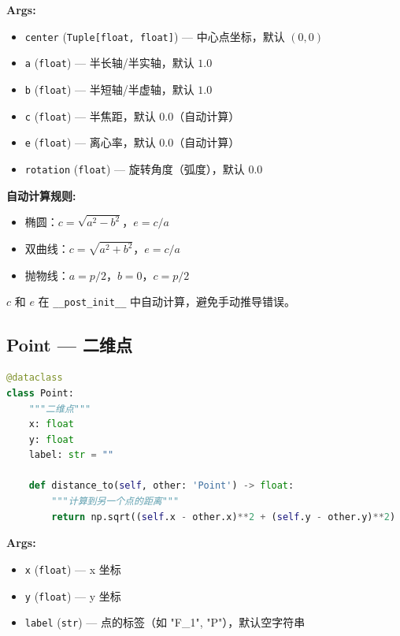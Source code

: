 \documentclass[11pt,a4paper]{article}
\begin{document}
\textbf{Args:}
\begin{itemize}
    \item \texttt{center} (\texttt{Tuple[float, float]}) — 中心点坐标，默认 $(0, 0)$
    \item \texttt{a} (\texttt{float}) — 半长轴/半实轴，默认 $1.0$
    \item \texttt{b} (\texttt{float}) — 半短轴/半虚轴，默认 $1.0$
    \item \texttt{c} (\texttt{float}) — 半焦距，默认 $0.0$（自动计算）
    \item \texttt{e} (\texttt{float}) — 离心率，默认 $0.0$（自动计算）
    \item \texttt{rotation} (\texttt{float}) — 旋转角度（弧度），默认 $0.0$
\end{itemize}

\textbf{自动计算规则:}
\begin{itemize}
    \item 椭圆：$c = \sqrt{a^2 - b^2}$，$e = c/a$
    \item 双曲线：$c = \sqrt{a^2 + b^2}$，$e = c/a$
    \item 抛物线：$a = p/2$，$b = 0$，$c = p/2$
\end{itemize}

\begin{tipbox}
$c$ 和 $e$ 在 \texttt{\_\_post\_init\_\_} 中自动计算，避免手动推导错误。
\end{tipbox}

\subsection{Point — 二维点}

\begin{lstlisting}[language=Python]
@dataclass
class Point:
    """二维点"""
    x: float
    y: float
    label: str = ""

    def distance_to(self, other: 'Point') -> float:
        """计算到另一个点的距离"""
        return np.sqrt((self.x - other.x)**2 + (self.y - other.y)**2)
\end{lstlisting}

\textbf{Args:}
\begin{itemize}
    \item \texttt{x} (\texttt{float}) — x 坐标
    \item \texttt{y} (\texttt{float}) — y 坐标
    \item \texttt{label} (\texttt{str}) — 点的标签（如 "F\_1", "P"），默认空字符串
\end{itemize}
\end{document}
